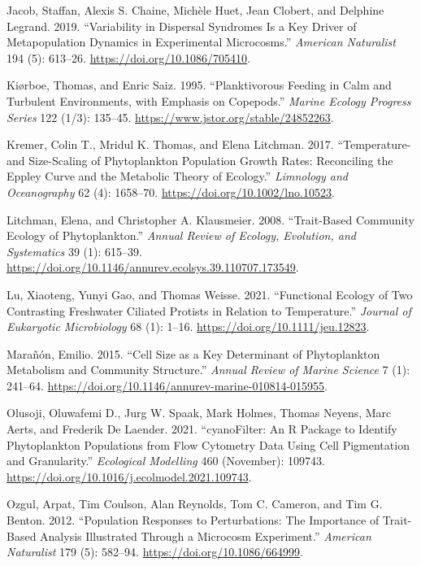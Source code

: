 \documentclass[
  letterpaper,
  DIV=11,
  numbers=noendperiod]{scrartcl}
\newlength{\cslhangindent}
\newenvironment{CSLReferences}[2] %
 {\begin{list}{}{%
  \setlength{\itemindent}{0pt}
  \setlength{\leftmargin}{0pt}
  \setlength{\parsep}{0pt}
  \ifodd #1
   \setlength{\leftmargin}{\cslhangindent}
   \setlength{\itemindent}{-1\cslhangindent}
  \fi
  \setlength{\itemsep}{#2\baselineskip}}}
 {\end{list}}
\begin{document}
\begin{CSLReferences}{1}{0}
Jacob, Staffan, Alexis S. Chaine, Michèle Huet, Jean Clobert, and
Delphine Legrand. 2019. {``Variability in Dispersal Syndromes Is a Key
Driver of Metapopulation Dynamics in Experimental Microcosms.''}
\emph{American Naturalist} 194 (5): 613--26.
\url{https://doi.org/10.1086/705410}.

Kiørboe, Thomas, and Enric Saiz. 1995. {``Planktivorous Feeding in Calm
and Turbulent Environments, with Emphasis on Copepods.''} \emph{Marine
Ecology Progress Series} 122 (1/3): 135--45.
\url{https://www.jstor.org/stable/24852263}.

Kremer, Colin T., Mridul K. Thomas, and Elena Litchman. 2017.
{``Temperature- and Size-Scaling of Phytoplankton Population Growth
Rates: {Reconciling} the {Eppley} Curve and the Metabolic Theory of
Ecology.''} \emph{Limnology and Oceanography} 62 (4): 1658--70.
\url{https://doi.org/10.1002/lno.10523}.

Litchman, Elena, and Christopher A. Klausmeier. 2008. {``Trait-{Based
Community Ecology} of {Phytoplankton}.''} \emph{Annual Review of
Ecology, Evolution, and Systematics} 39 (1): 615--39.
\url{https://doi.org/10.1146/annurev.ecolsys.39.110707.173549}.

Lu, Xiaoteng, Yunyi Gao, and Thomas Weisse. 2021. {``Functional Ecology
of Two Contrasting Freshwater Ciliated Protists in Relation to
Temperature.''} \emph{Journal of Eukaryotic Microbiology} 68 (1): 1--16.
\url{https://doi.org/10.1111/jeu.12823}.

Marañón, Emilio. 2015. {``Cell {Size} as a {Key Determinant} of
{Phytoplankton Metabolism} and {Community Structure}.''} \emph{Annual
Review of Marine Science} 7 (1): 241--64.
\url{https://doi.org/10.1146/annurev-marine-010814-015955}.

Olusoji, Oluwafemi D., Jurg W. Spaak, Mark Holmes, Thomas Neyens, Marc
Aerts, and Frederik De Laender. 2021. {``{cyanoFilter}: {An R} Package
to Identify Phytoplankton Populations from Flow Cytometry Data Using
Cell Pigmentation and Granularity.''} \emph{Ecological Modelling} 460
(November): 109743.
\url{https://doi.org/10.1016/j.ecolmodel.2021.109743}.

Ozgul, Arpat, Tim Coulson, Alan Reynolds, Tom C. Cameron, and Tim G.
Benton. 2012. {``Population Responses to Perturbations: {The} Importance
of Trait-Based Analysis Illustrated Through a Microcosm Experiment.''}
\emph{American Naturalist} 179 (5): 582--94.
\url{https://doi.org/10.1086/664999}.


\end{CSLReferences}
\end{document}
